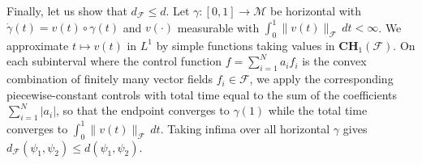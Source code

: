 \documentclass[12pt]{amsart}
\numberwithin{equation}{section}
\theoremstyle{remark}
\begin{document}

Finally, let us show that $d_{\mathcal F}\le d$.
Let $\gamma:[0,1]\to\mathcal M$ be horizontal with $\dot\gamma(t)=v(t)\circ \gamma(t)$ and $v(\cdot)$ measurable with $\int_0^1\|v(t)\|_{\mathcal F}\,dt<\infty$.
We approximate $t\mapsto v(t)$
in $L^1$ by simple functions taking values in $\mathbf{CH}_1(\mathcal F)$.
On each subinterval where the control function $f = \sum_{i=1}^N a_i f_i$ is the convex combination of finitely many vector fields $f_i\in\mathcal F$,
we apply the corresponding piecewise-constant controls with total time equal to the sum of the coefficients $\sum_{i=1}^N |a_i|$,
so that the endpoint converges to $\gamma(1)$ while the total time converges to $\int_0^1\|v(t)\|_{{\mathcal F}}\,dt$.
Taking infima over all horizontal $\gamma$ gives $d_{\mathcal F}(\psi_1,\psi_2)\le d(\psi_1,\psi_2)$.
\end{document}
